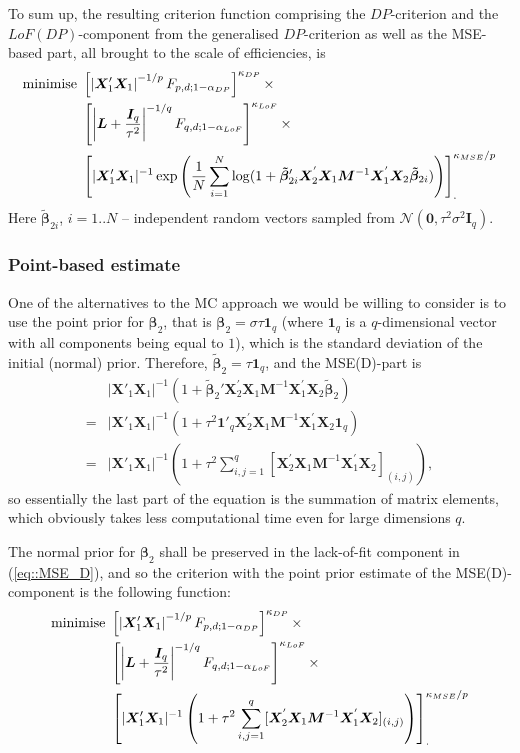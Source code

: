 To sum up, the resulting criterion function comprising the $DP$-criterion and the $LoF(DP)$-component from the generalised $DP$-criterion as well as the MSE-based part, all brought to the scale of efficiencies, is
\begin{align}
\label{eq::MSE_D}
\mbox{minimise }&\left[\left|\bm{X}'_{1}\bm{X}_{1}\right|^{-1/p}F_{p,d;1-\alpha_{DP}}\right]^{\kappa_{DP}} \times \notag \\ &\left[\left|\bm{L}+\frac{\bm{I}_{q}}{\tau^{2}}\right|^{-1/q}F_{q,d;1-\alpha_{LoF}}\right]^{\kappa_{LoF}}\times \notag\\ & \left[|\bm{X}'_{1}\bm{X}_{1}|^{-1}\exp\left(\frac{1}{N}\sum_{i=1}^{N}\log(1+\bm{\tilde{\beta}}_{2i}'\bm{X}_2^{'}\bm{X}_1\bm{M}^{-1}\bm{X}_1^{'}\bm{X}_2\bm{\tilde{\beta}}_{2i})\right)\right]_{.}^{\kappa_{MSE}/p}
\end{align}
Here $\bm{\tilde{\beta}}_{2i}$, $i=1..N$ -- independent random vectors sampled from $\mathcal{N}(\bm{0},\tau^{2}\sigma^{2}\bm{I}_{q})$.

\subsubsection{Point-based estimate}

One of the alternatives to the MC approach we would be willing to consider is to use the point prior for $\bm{\beta}_2$, that is $\bm{\beta}_2=\sigma\tau\bm{1}_q$ (where $\bm{1}_q$ is a $q$-dimensional vector with all components being equal to $1$), which is the standard deviation  of the initial (normal) prior. Therefore, $\bm{\tilde{\beta}}_2=\tau\bm{1}_q$, and the MSE(D)-part is
\begin{align*}
&|\bm{X}'_{1}\bm{X}_{1}|^{-1}(1+\bm{\tilde{\beta}}_{2}'\bm{X}_2^{'}\bm{X}_1\bm{M}^{-1}\bm{X}_1^{'}\bm{X}_2\bm{\tilde{\beta}}_{2})\\=&|\bm{X}'_{1}\bm{X}_{1}|^{-1}(1+\tau^2\bm{1}'_q\bm{X}_2^{'}\bm{X}_1\bm{M}^{-1}\bm{X}_1^{'}\bm{X}_2\bm{1}_q)\\=&|\bm{X}'_{1}\bm{X}_{1}|^{-1}\left(1+\tau^2\sum_{i,j=1}^{q}[\bm{X}_2^{'}\bm{X}_1\bm{M}^{-1}\bm{X}_1^{'}\bm{X}_2]_{(i,j)}\right),
\end{align*}
so essentially the last part of the equation is the summation of matrix elements, which obviously takes less computational time even for large dimensions $q$. 

The normal prior for $\bm{\beta}_2$ shall be preserved in the lack-of-fit component in (\ref{eq::MSE_D}), and so the criterion with the point prior estimate of the MSE(D)-component is the following function:
\begin{align}
\label{eq::MSE_D_point}
\mbox{minimise }&\left[\left|\bm{X}'_{1}\bm{X}_{1}\right|^{-1/p}F_{p,d;1-\alpha_{DP}}\right]^{\kappa_{DP}} \times \notag \\ &\left[\left|\bm{L}+\frac{\bm{I}_{q}}{\tau^{2}}\right|^{-1/q}F_{q,d;1-\alpha_{LoF}}\right]^{\kappa_{LoF}}\times \notag\\ & \left[|\bm{X}'_{1}\bm{X}_{1}|^{-1}\left(1+\tau^2\sum_{i,j=1}^{q}[\bm{X}_2^{'}\bm{X}_1\bm{M}^{-1}\bm{X}_1^{'}\bm{X}_2]_{(i,j)}\right)\right]_{.}^{\kappa_{MSE}/p}
\end{align}

